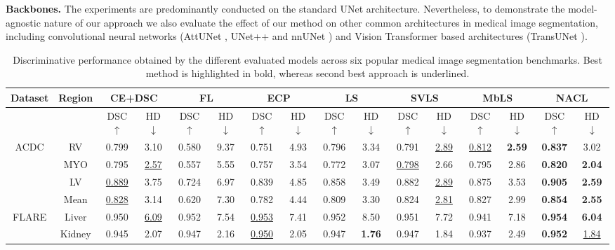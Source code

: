 \documentclass[twocolumn,final,10pt]{elsarticle}
\newcommand{\ours}{\mbox{NACL}}
\newcommand\und[1]{\underline{#1}}
\newcommand{\rev}[1]{{\color{black}#1}}
\begin{document}
\noindent \textbf{Backbones.} The experiments are predominantly conducted on the standard UNet \citep{unet} architecture. \rev{Nevertheless, to demonstrate the model-agnostic nature of our approach we also evaluate the effect of our method on other common architectures in medical image segmentation, including convolutional neural networks (AttUNet \citep{attunet}, UNet++ \citep{unetpp} and nnUNet \citep{isensee2021nnu}) and Vision Transformer based architectures (TransUNet \citep{transunet}).}



\begin{table}[h!]
\scriptsize
\centering
\caption{Discriminative performance obtained by the different evaluated models across six popular medical image segmentation benchmarks. Best method is highlighted in bold, whereas second best approach is underlined.}
\label{tab:main-disc}
\begin{tabular}{c|c|cccccccccccccc}
\toprule
Dataset &  Region & \multicolumn{2}{c}{CE+DSC} & \multicolumn{2}{c}{FL} & \multicolumn{2}{c}{ECP} & \multicolumn{2}{c}{LS} & \multicolumn{2}{c}{SVLS} & \multicolumn{2}{c}{MbLS} & \multicolumn{2}{c}{\ours}\\
\midrule
& & DSC $\uparrow$ & HD $\downarrow$ & DSC $\uparrow$ & HD $\downarrow$  & DSC $\uparrow$ & HD $\downarrow$  & DSC $\uparrow$ & HD $\downarrow$  & DSC $\uparrow$ & HD $\downarrow$  & DSC $\uparrow$ & HD $\downarrow$  & DSC $\uparrow$ & HD $\downarrow$  \\
\midrule
\multirow{4}{*}{ACDC} & RV 
 & 0.799 & 3.10 & 0.580 & 9.37 & 0.751 & 4.93 & 0.796 & 3.34 & 0.791 & \und{2.89} & \und{0.812} & \textbf{2.59} & \textbf{0.837} & 3.02 \\ 
 & MYO & 0.795 & \und{2.57} & 0.557 & 5.55 & 0.757 & 3.54 & 0.772 & 3.07 & \und{0.798} & 2.66 & 0.795 & 2.86 & \textbf{0.820} & \textbf{2.04} \\ 
 & LV & \und{0.889} & 3.75 & 0.724 & 6.97 & 0.839 & 4.85 & 0.858 & 3.49 & 0.882 & \und{2.89} & 0.875 & 3.53 & \textbf{0.905} & \textbf{2.59} \\ 
 \rowcolor{gray!20} & Mean & \und{0.828} & 3.14 & 0.620 & 7.30 & 0.782 & 4.44 & 0.809 & 3.30 & 0.824 & \und{2.81} & 0.827 & 2.99 & \textbf{0.854} & \textbf{2.55}\\  
 \midrule
 \multirow{5}{*}{FLARE} & Liver & 0.950 & \und{6.09} & 0.952 & 7.54 & \und{0.953} & 7.41 & 0.952 & 8.50 & 0.951 & 7.72 & 0.941 & 7.18 & \textbf{0.954} & \textbf{6.04} \\
 & Kidney & 0.945 & 2.07 & 0.947 & 2.16 & \und{0.950} & 2.05 & 0.947 & \textbf{1.76} & 0.947 & 1.84 & 0.937 & 2.49 & \textbf{0.952} & \und{1.84} \\

\end{tabular}
\end{table}
\end{document}
